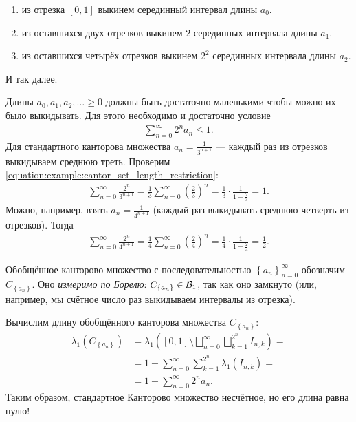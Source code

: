 \begin{exmpl}
\begin{enumerate}
   \begin{enumerate}[start=0,label={Шаг \arabic*:}]
    \item  из отрезка $[0,1]$ выкинем серединный интервал длины $a_0$.
    \item из оставшихся двух отрезков выкинем $2$ серединных интервала длины $a_1$.
    \item из оставшихся четырёх отрезков выкинем $2^{2}$  серединных интервала длины $a_2$.
   \end{enumerate} И так далее.

   Длины $a_0, a_1, a_2, \ldots \geqslant 0$ должны быть достаточно маленькими чтобы можно их было выкидывать. Для этого необходимо и достаточно условие
   \begin{align}
    \label{equation:example:cantor_set_length_restriction}
    \sum_{n=0}^{\infty} 2^{n} a_n \leqslant 1
   .\end{align} Для стандартного канторова множества $a_n = \frac{1}{3^{n+1}}$ --- каждый раз из отрезков выкидываем среднюю треть. Проверим \eqref{equation:example:cantor_set_length_restriction}:
   \begin{align*}
    \sum_{n=0}^{\infty} \frac{2^{n}}{3^{n+1}} = \frac{1}{3} \sum_{n=0}^{\infty} \left( \frac{2}{3} \right)^{n} = \frac{1}{3} \cdot \frac{1}{1 - \frac{2}{3}} = 1
   .\end{align*} Можно, например, взять $a_n = \frac{1}{4^{n+1}}$ (каждый раз выкидывать среднюю четверть из отрезков). Тогда
   \begin{align*}
    \sum_{n=0}^{\infty} \frac{2^{n}}{4^{n+1}} = \frac{1}{4} \sum_{n=0}^{\infty} \left(\frac{2}{4}\right)^{n} = \frac{1}{4} \cdot \frac{1}{1 - \frac{2}{4}} = \frac{1}{2}
   .\end{align*}

   Обобщённое канторово множество с последовательностью $\left\{ a_n \right\}_{n=0}^{\infty}$ обозначим $C_{\left\{ a_n \right\}}$. Оно \textit{измеримо по Борелю}: $C_{\left\{ a_n \right\}} \in \mathcal{B}_1$, так как оно замкнуто (или, например, мы счётное число раз выкидываем интервалы из отрезка).

   Вычислим длину обобщённого канторова множества $C_{\left\{ a_n \right\}}$:
   \begin{align*}
    \lambda_1 \left( C_{\left\{ a_n \right\}} \right)
    & = \lambda_{1} \left( [0, 1] \setminus \bigsqcup_{n=0}^{\infty} \bigsqcup_{k=1}^{2^{n}} I_{n,k} \right) = \\
    &=  1 - \sum_{n=0}^{\infty} \sum_{k=1}^{2^{n}} \lambda_1(I_{n,k}) = \\
    &= 1 - \sum_{n=0}^{\infty} 2^{n} a_n
   .\end{align*} Таким образом, стандартное Канторово множество несчётное, но его длина равна нулю!


\end{enumerate}
\end{exmpl}
